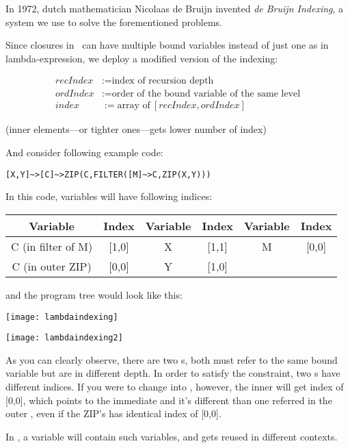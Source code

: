 In 1972, dutch mathematician Nicolaas de Bruijn invented \emph{de Bruijn Indexing}, a system we use to solve the forementioned problems.

Since closures in \tbas\ can have multiple bound variables instead of just one as in lambda-expression, we deploy a modified version of the indexing:

\begin{align}
recIndex &:= \text{index of recursion depth}\\
ordIndex &:= \text{order of the bound variable of the same level}\\
index &:= \text{array of}\ [recIndex, ordIndex]
\end{align}

(inner elements---or tighter ones---gets lower number of index)

And consider following example code:

\begin{lstlisting}
[X,Y]~>[C]~>ZIP(C,FILTER([M]~>C,ZIP(X,Y)))
\end{lstlisting}

In this code, variables will have following indices:

\begin{tabulary}{\textwidth}{cC|cC|cC}
Variable & Index & Variable & Index & Variable & Index \\
\hline
C {\condensedfont (in filter of M)} & [1,0] & X & [1,1] & M & [0,0] \\
C {\condensedfont (in outer ZIP)} & [0,0] & Y & [1,0] & \ & \ \\
\end{tabulary}

and the program tree would look like this:

{\centering
\begin{minipage}{.5\textwidth}
  \centering
  \texttt{[image: lambdaindexing]}
  \label{fig:lambdaraw}
\end{minipage}%
\begin{minipage}{.5\textwidth}
  \centering
  \texttt{[image: lambdaindexing2]}
  \label{fig:lambdaindexed}
\end{minipage}
}

As you can clearly observe, there are two s, both must refer to the same bound variable but are in different depth. In order to satisfy the constraint, two s have different indices. If you were to change \code{[M]} into \code{[C]}, however, the inner  will get index of [0,0], which points to the immediate  and it's different  than one referred in the outer , even if the ZIP's  has identical index of [0,0].

In , a variable  will contain such variables, and gets reused in different contexts.
